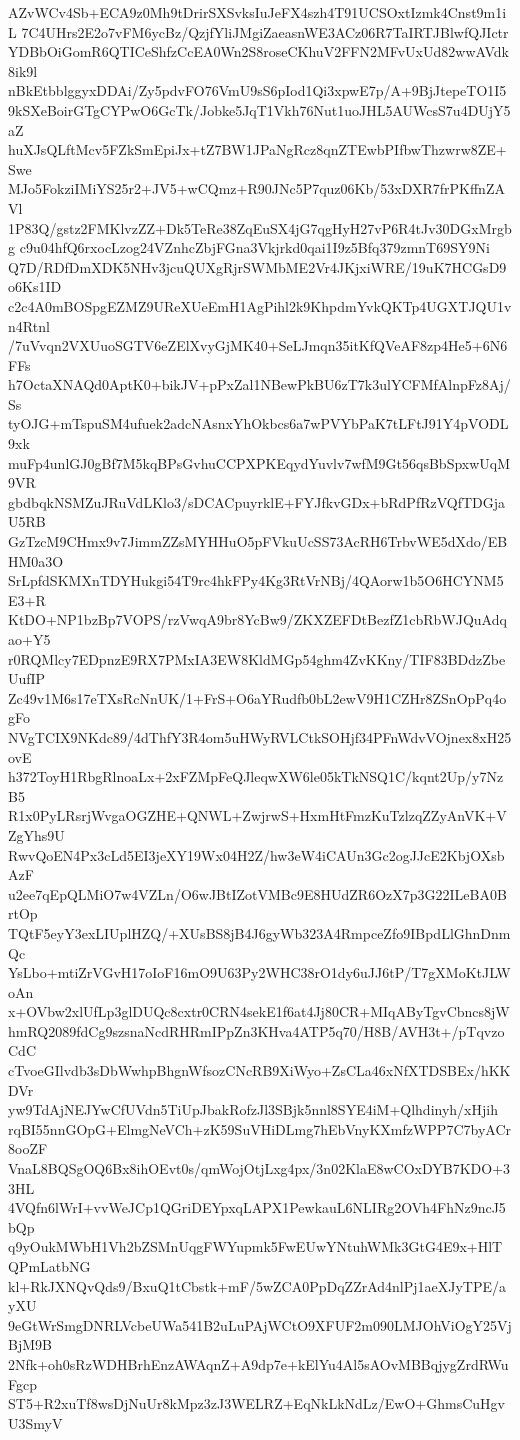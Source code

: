 AZvWCv4Sb+ECA9z0Mh9tDrirSXSvksIuJeFX4szh4T91UCSOxtIzmk4Cnst9m1iL
7C4UHrs2E2o7vFM6ycBz/QzjfYliJMgiZaeasnWE3ACz06R7TaIRTJBlwfQJIctr
YDBbOiGomR6QTICeShfzCcEA0Wn2S8roseCKhuV2FFN2MFvUxUd82wwAVdk8ik9l
nBkEtbblggyxDDAi/Zy5pdvFO76VmU9sS6pIod1Qi3xpwE7p/A+9BjJtepeTO1I5
9kSXeBoirGTgCYPwO6GcTk/Jobke5JqT1Vkh76Nut1uoJHL5AUWcsS7u4DUjY5aZ
huXJsQLftMcv5FZkSmEpiJx+tZ7BW1JPaNgRcz8qnZTEwbPIfbwThzwrw8ZE+Swe
MJo5FokziIMiYS25r2+JV5+wCQmz+R90JNc5P7quz06Kb/53xDXR7frPKffnZAVl
1P83Q/gstz2FMKlvzZZ+Dk5TeRe38ZqEuSX4jG7qgHyH27vP6R4tJv30DGxMrgbg
c9u04hfQ6rxocLzog24VZnhcZbjFGna3Vkjrkd0qai1I9z5Bfq379zmnT69SY9Ni
Q7D/RDfDmXDK5NHv3jcuQUXgRjrSWMbME2Vr4JKjxiWRE/19uK7HCGsD9o6Ks1ID
c2c4A0mBOSpgEZMZ9UReXUeEmH1AgPihl2k9KhpdmYvkQKTp4UGXTJQU1vn4Rtnl
/7uVvqn2VXUuoSGTV6eZElXvyGjMK40+SeLJmqn35itKfQVeAF8zp4He5+6N6FFs
h7OctaXNAQd0AptK0+bikJV+pPxZal1NBewPkBU6zT7k3ulYCFMfAlnpFz8Aj/Ss
tyOJG+mTspuSM4ufuek2adcNAsnxYhOkbcs6a7wPVYbPaK7tLFtJ91Y4pVODL9xk
muFp4unlGJ0gBf7M5kqBPsGvhuCCPXPKEqydYuvlv7wfM9Gt56qsBbSpxwUqM9VR
gbdbqkNSMZuJRuVdLKlo3/sDCACpuyrklE+FYJfkvGDx+bRdPfRzVQfTDGjaU5RB
GzTzcM9CHmx9v7JimmZZsMYHHuO5pFVkuUcSS73AcRH6TrbvWE5dXdo/EBHM0a3O
SrLpfdSKMXnTDYHukgi54T9rc4hkFPy4Kg3RtVrNBj/4QAorw1b5O6HCYNM5E3+R
KtDO+NP1bzBp7VOPS/rzVwqA9br8YcBw9/ZKXZEFDtBezfZ1cbRbWJQuAdqao+Y5
r0RQMlcy7EDpnzE9RX7PMxIA3EW8KldMGp54ghm4ZvKKny/TIF83BDdzZbeUufIP
Zc49v1M6s17eTXsRcNnUK/1+FrS+O6aYRudfb0bL2ewV9H1CZHr8ZSnOpPq4ogFo
NVgTCIX9NKdc89/4dThfY3R4om5uHWyRVLCtkSOHjf34PFnWdvVOjnex8xH25ovE
h372ToyH1RbgRlnoaLx+2xFZMpFeQJleqwXW6le05kTkNSQ1C/kqnt2Up/y7NzB5
R1x0PyLRsrjWvgaOGZHE+QNWL+ZwjrwS+HxmHtFmzKuTzlzqZZyAnVK+VZgYhs9U
RwvQoEN4Px3cLd5EI3jeXY19Wx04H2Z/hw3eW4iCAUn3Gc2ogJJcE2KbjOXsbAzF
u2ee7qEpQLMiO7w4VZLn/O6wJBtIZotVMBc9E8HUdZR6OzX7p3G22ILeBA0BrtOp
TQtF5eyY3exLIUplHZQ/+XUsBS8jB4J6gyWb323A4RmpceZfo9IBpdLlGhnDnmQc
YsLbo+mtiZrVGvH17oIoF16mO9U63Py2WHC38rO1dy6uJJ6tP/T7gXMoKtJLWoAn
x+OVbw2xlUfLp3glDUQc8cxtr0CRN4sekE1f6at4Jj80CR+MIqAByTgvCbncs8jW
hmRQ2089fdCg9szsnaNcdRHRmIPpZn3KHva4ATP5q70/H8B/AVH3t+/pTqvzoCdC
cTvoeGIlvdb3sDbWwhpBhgnWfsozCNcRB9XiWyo+ZsCLa46xNfXTDSBEx/hKKDVr
yw9TdAjNEJYwCfUVdn5TiUpJbakRofzJl3SBjk5nnl8SYE4iM+Qlhdinyh/xHjih
rqBI55nnGOpG+ElmgNeVCh+zK59SuVHiDLmg7hEbVnyKXmfzWPP7C7byACr8ooZF
VnaL8BQSgOQ6Bx8ihOEvt0s/qmWojOtjLxg4px/3n02KlaE8wCOxDYB7KDO+33HL
4VQfn6lWrI+vvWeJCp1QGriDEYpxqLAPX1PewkauL6NLIRg2OVh4FhNz9ncJ5bQp
q9yOukMWbH1Vh2bZSMnUqgFWYupmk5FwEUwYNtuhWMk3GtG4E9x+HlTQPmLatbNG
kl+RkJXNQvQds9/BxuQ1tCbstk+mF/5wZCA0PpDqZZrAd4nlPj1aeXJyTPE/ayXU
9eGtWrSmgDNRLVcbeUWa541B2uLuPAjWCtO9XFUF2m090LMJOhViOgY25VjBjM9B
2Nfk+oh0sRzWDHBrhEnzAWAqnZ+A9dp7e+kElYu4Al5sAOvMBBqjygZrdRWuFgcp
ST5+R2xuTf8wsDjNuUr8kMpz3zJ3WELRZ+EqNkLkNdLz/EwO+GhmsCuHgvU3SmyV
